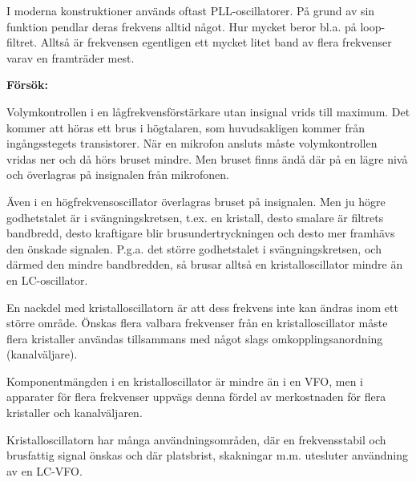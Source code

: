 I moderna konstruktioner används oftast PLL-oscillatorer.
På grund av sin funktion pendlar deras frekvens alltid något.
Hur mycket beror bl.a. på loop-filtret.
Alltså är frekvensen egentligen ett mycket litet band av flera frekvenser varav
en framträder mest.

\textbf{Försök:}

Volymkontrollen i en lågfrekvensförstärkare utan insignal vrids till maximum.
Det kommer att höras ett brus i högtalaren, som huvudsakligen kommer från
ingångsstegets transistorer.
När en mikrofon ansluts måste volymkontrollen vridas ner och då hörs bruset
mindre.
Men bruset finns ändå där på en lägre nivå och överlagras på insignalen från
mikrofonen.

Även i en högfrekvensoscillator överlagras bruset på insignalen.
Men ju högre godhetstalet är i svängningskretsen, t.ex. en kristall, desto
smalare är filtrets bandbredd, desto kraftigare blir brusundertryckningen och
desto mer framhävs den önskade signalen.
P.g.a. det större godhetstalet i svängningskretsen, och därmed den mindre
bandbredden, så brusar alltså en kristalloscillator mindre än en LC-oscillator.

En nackdel med kristalloscillatorn är att dess frekvens inte kan
ändras inom ett större område.
Önskas flera valbara frekvenser från en kristalloscillator måste flera
kristaller användas tillsammans med något slags omkopplingsanordning
(kanalväljare).

Komponentmängden i en kristalloscillator är mindre än i en VFO, men i
apparater för flera frekvenser uppvägs denna fördel av merkostnaden
för flera kristaller och kanalväljaren.

Kristalloscillatorn har många användningsområden, där en
frekvensstabil och brusfattig signal önskas och där platsbrist,
skakningar m.m. utesluter användning av en LC-VFO.

